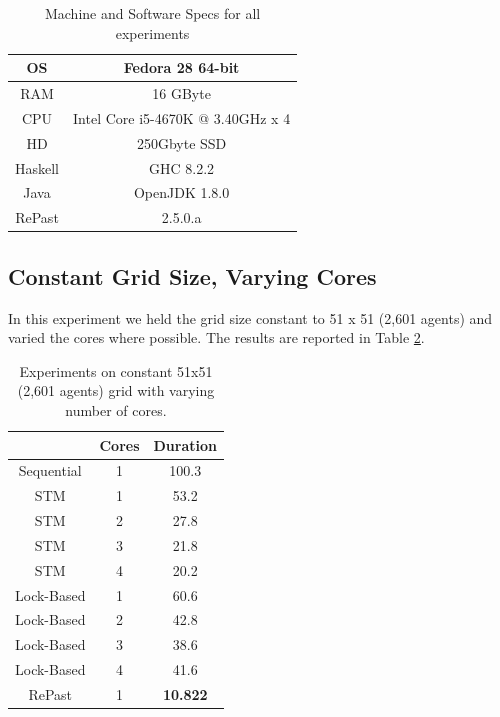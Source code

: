 \begin{table}
	\centering
	\begin{tabular}{ c || c }
		OS & Fedora 28 64-bit \\ \hline
		RAM & 16 GByte \\ \hline
		CPU & Intel Core i5-4670K @ 3.40GHz x 4 \\ \hline
		HD & 250Gbyte SSD \\ \hline
		Haskell & GHC 8.2.2 \\ \hline
		Java & OpenJDK 1.8.0 \\ \hline
		RePast & 2.5.0.a
	\end{tabular}
	
	\caption{Machine and Software Specs for all experiments}
	\label{tab:machine_specs}
\end{table}

\subsection{Constant Grid Size, Varying Cores}
In this experiment we held the grid size constant to 51 x 51 (2,601 agents) and varied the cores where possible. The results are reported in Table \ref{tab:constgrid_varyingcores}.

\begin{table}
	\centering
  	\begin{tabular}{ c || c | c  }
                    & Cores & Duration  \\ \hline \hline 
    	Sequential  & 1     & 100.3     \\ \hline \hline
   		STM         & 1     & 53.2      \\ \hline
   		STM         & 2     & 27.8      \\ \hline
   		STM         & 3     & 21.8      \\ \hline
   		STM         & 4     & 20.2      \\ \hline \hline
   		Lock-Based  & 1     & 60.6      \\ \hline 
   		Lock-Based  & 2     & 42.8      \\ \hline 
   		Lock-Based  & 3     & 38.6      \\ \hline 
   		Lock-Based  & 4     & 41.6      \\ \hline \hline
   		RePast      & 1     & \textbf{10.822}
  	\end{tabular}
  	
  	\caption{Experiments on constant 51x51 (2,601 agents) grid with varying number of cores.}
	\label{tab:constgrid_varyingcores}
\end{table}

